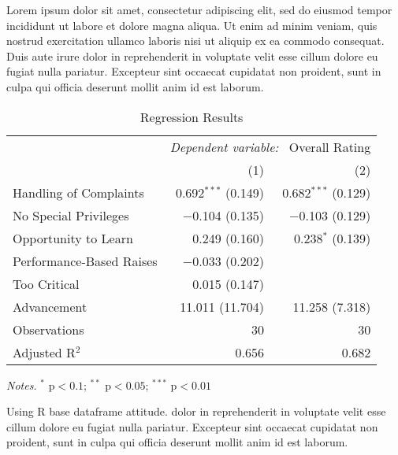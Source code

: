 \documentclass[12pt]{article}
\begin{document}
Lorem ipsum dolor sit amet, consectetur adipiscing elit, sed do eiusmod tempor incididunt ut labore et dolore magna aliqua. Ut enim ad minim veniam, quis nostrud exercitation ullamco laboris nisi ut aliquip ex ea commodo consequat. Duis aute irure dolor in reprehenderit in voluptate velit esse cillum dolore eu fugiat nulla pariatur. Excepteur sint occaecat cupidatat non proident, sunt in culpa qui officia deserunt mollit anim id est laborum.

\begin{table}[tb]
  \caption{Regression Results}
  \label{tab:reg1}

  \begin{adjustbox}{center}
    \begin{threeparttable}
      \begin{tabular}{@{}
          lrr
          @{}}

        \toprule
        & \multicolumn{2}{c}{\textit{Dependent variable:} \ Overall Rating} \\
        \cmidrule{2-3}
                                 & (1)                   & (2)                   \\
        \hline

        Handling of Complaints   & 0.692$^{***}$ (0.149) & 0.682$^{***}$ (0.129) \\
        No Special Privileges    & $-$0.104 (0.135)      & $-$0.103 (0.129)      \\
        Opportunity to Learn     & 0.249 (0.160)         & 0.238$^{*}$ (0.139)   \\
        Performance-Based Raises & $-$0.033 (0.202)      &                       \\
        Too Critical             & 0.015 (0.147)         &                       \\
        Advancement              & 11.011 (11.704)       & 11.258 (7.318)        \\
        \hline
        Observations             & 30                    & 30                    \\
        Adjusted R$^{2}$         & 0.656                 & 0.682                 \\

        \bottomrule
      \end{tabular}

      \begin{tablenotes}\setlength{}\small
        \item {\small \textit{Notes.} $^{*}$ p$< 0.1$; $^{**}$ p$< 0.05$; $^{***}$ p$< 0.01$}
        \item {\small Using R base dataframe attitude. dolor in reprehenderit in voluptate velit esse cillum dolore eu fugiat nulla pariatur. Excepteur sint occaecat cupidatat non proident, sunt in culpa qui officia deserunt mollit anim id est laborum. }
      \end{tablenotes}
    \end{threeparttable}
  \end{adjustbox}
\end{table}
\end{document}
